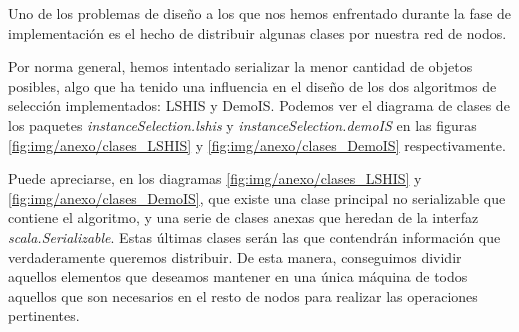 Uno de los problemas de diseño a los que nos hemos enfrentado durante la fase de implementación es el hecho de distribuir algunas clases por nuestra red de nodos.

Por norma general, hemos intentado serializar la menor cantidad de objetos posibles, algo que ha tenido una influencia en el diseño de los dos algoritmos de selección implementados: LSHIS y DemoIS. Podemos ver el diagrama de clases de los paquetes \textit{instanceSelection.lshis} y \textit{instanceSelection.demoIS} en las figuras \ref{fig:img/anexo/clases_LSHIS} y \ref{fig:img/anexo/clases_DemoIS} respectivamente.



Puede apreciarse, en los diagramas \ref{fig:img/anexo/clases_LSHIS} y \ref{fig:img/anexo/clases_DemoIS}, que existe una clase principal no serializable que contiene el algoritmo, y una serie de clases anexas que heredan de la interfaz \textit{scala.Serializable}. Estas últimas clases serán las que contendrán información que verdaderamente queremos distribuir. De esta manera, conseguimos dividir aquellos elementos que deseamos mantener en una única máquina de todos aquellos que son necesarios en el resto de nodos para realizar las operaciones pertinentes.